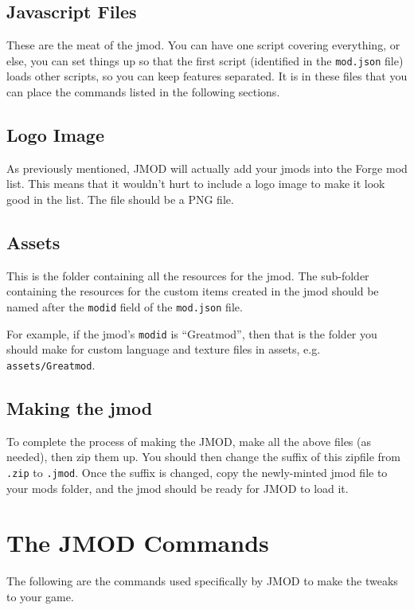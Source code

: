 \documentclass[letterpaper,titlepage,12pt]{article}
\begin{document}
\subsection{Javascript Files}

These are the meat of the jmod.  You can have one script covering everything, or else, you can set things up so that the first script (identified in the \texttt{mod.json} file) loads other scripts, so you can keep features separated.  It is in these files that you can place the commands listed in the following sections.

\subsection{Logo Image}

As previously mentioned, JMOD will actually add your jmods into the Forge mod list.  This means that it wouldn't hurt to include a logo image to make it look good in the list.  The file should be a PNG file.

\subsection{Assets}

This is the folder containing all the resources for the jmod.  The sub-folder containing the resources for the custom items created in the jmod should be named after the \texttt{modid} field of the \texttt{mod.json} file.

For example, if the jmod's \texttt{modid} is ``Greatmod'', then that is the folder you should make for custom language and texture files in assets, e.g. \texttt{assets/Greatmod}.

\subsection{Making the jmod}

To complete the process of making the JMOD, make all the above files (as needed), then zip them up.  You should then change the suffix of this zipfile from \texttt{.zip} to \texttt{.jmod}.  Once the suffix is changed, copy the newly-minted jmod file to your mods folder, and the jmod should be ready for JMOD to load it.

\section{The JMOD Commands}

The following are the commands used specifically by JMOD to make the tweaks to your game.
\end{document}

